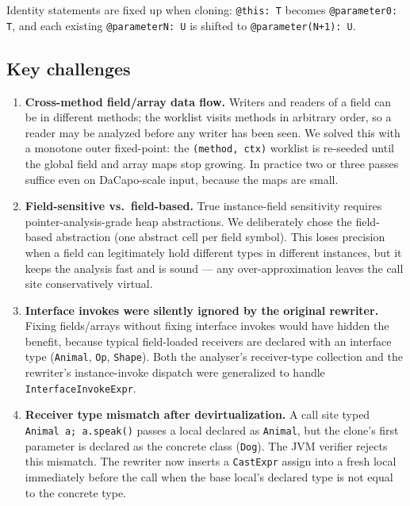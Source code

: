 \documentclass[11pt,a4paper]{article}
\begin{document}
Identity statements are fixed up when cloning: \texttt{@this: T} becomes
\texttt{@parameter0: T}, and each existing \texttt{@parameterN: U} is
shifted to \texttt{@parameter(N+1): U}.

\subsection*{Key challenges}

\begin{enumerate}[topsep=2pt,itemsep=2pt]
  \item \textbf{Cross-method field/array data flow.} Writers and readers
    of a field can be in different methods; the worklist visits methods
    in arbitrary order, so a reader may be analyzed before any writer
    has been seen. We solved this with a monotone outer fixed-point: the
    \texttt{(method, ctx)} worklist is re-seeded until the global field
    and array maps stop growing. In practice two or three passes suffice
    even on DaCapo-scale input, because the maps are small.

  \item \textbf{Field-sensitive vs.\ field-based.} True
    instance-field sensitivity requires pointer-analysis-grade heap
    abstractions. We deliberately chose the field-based abstraction (one
    abstract cell per field symbol). This loses precision when a field
    can legitimately hold different types in different instances, but it
    keeps the analysis fast and is sound --- any over-approximation
    leaves the call site conservatively virtual.

  \item \textbf{Interface invokes were silently ignored by the original
    rewriter.} Fixing fields/arrays without fixing interface invokes
    would have hidden the benefit, because typical field-loaded
    receivers are declared with an interface type (\texttt{Animal},
    \texttt{Op}, \texttt{Shape}). Both the analyser's receiver-type
    collection and the rewriter's instance-invoke dispatch were
    generalized to handle \texttt{InterfaceInvokeExpr}.

  \item \textbf{Receiver type mismatch after devirtualization.} A call
    site typed \texttt{Animal a; a.speak()} passes a local declared as
    \texttt{Animal}, but the clone's first parameter is declared as the
    concrete class (\texttt{Dog}). The JVM verifier rejects this
    mismatch. The rewriter now inserts a \texttt{CastExpr} assign into a
    fresh local immediately before the call when the base local's
    declared type is not equal to the concrete type.


\end{enumerate}
\end{document}
